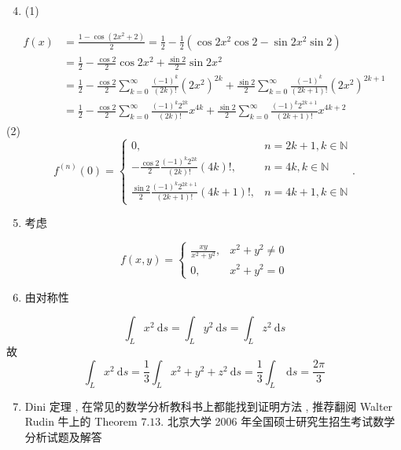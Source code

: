 \documentclass[10pt]{article}
\begin{document}
\begin{enumerate}
  \setcounter{enumi}{3}
  \item (1)
\end{enumerate}
$$
\begin{aligned}
f(x) &=\frac{1-\cos \left(2 x^{2}+2\right)}{2}=\frac{1}{2}-\frac{1}{2}\left(\cos 2 x^{2} \cos 2-\sin 2 x^{2} \sin 2\right) \\
&=\frac{1}{2}-\frac{\cos 2}{2} \cos 2 x^{2}+\frac{\sin 2}{2} \sin 2 x^{2} \\
&=\frac{1}{2}-\frac{\cos 2}{2} \sum_{k=0}^{\infty} \frac{(-1)^{k}}{(2 k) !}\left(2 x^{2}\right)^{2 k}+\frac{\sin 2}{2} \sum_{k=0}^{\infty} \frac{(-1)^{k}}{(2 k+1) !}\left(2 x^{2}\right)^{2 k+1} \\
&=\frac{1}{2}-\frac{\cos 2}{2} \sum_{k=0}^{\infty} \frac{(-1)^{k} 2^{2 k}}{(2 k) !} x^{4 k}+\frac{\sin 2}{2} \sum_{k=0}^{\infty} \frac{(-1)^{k} 2^{2 k+1}}{(2 k+1) !} x^{4 k+2}
\end{aligned}
$$
(2)
$$
f^{(n)}(0)=\left\{\begin{array}{ll}
0, & n=2 k+1, k \in \mathbb{N} \\
-\frac{\cos 2}{2} \frac{(-1)^{k} 2^{2 k}}{(2 k) !}(4 k) !, & n=4 k, k \in \mathbb{N} \\
\frac{\sin 2}{2} \frac{(-1)^{k} 2^{2 k+1}}{(2 k+1) !}(4 k+1) !, & n=4 k+1, k \in \mathbb{N}
\end{array} .\right.
$$

\begin{enumerate}
  \setcounter{enumi}{4}
  \item  考虑 
\end{enumerate}
$$
f(x, y)= \begin{cases}\frac{x y}{x^{2}+y^{2}}, & x^{2}+y^{2} \neq 0 \\ 0, & x^{2}+y^{2}=0\end{cases}
$$

\begin{enumerate}
  \setcounter{enumi}{5}
  \item  由对称性 
\end{enumerate}
$$
\int_{L} x^{2} \mathrm{~d} s=\int_{L} y^{2} \mathrm{~d} s=\int_{L} z^{2} \mathrm{~d} s
$$
 故 
$$
\int_{L} x^{2} \mathrm{~d} s=\frac{1}{3} \int_{L} x^{2}+y^{2}+z^{2} \mathrm{~d} s=\frac{1}{3} \int_{L} \mathrm{~d} s=\frac{2 \pi}{3}
$$

\begin{enumerate}
  \setcounter{enumi}{6}
  \item Dini  定理 ,  在常见的数学分析教科书上都能找到证明方法 ,  推荐翻阅  Walter Rudin  牛上的  Theorem $7.13$.  北京大学  2006  年全国硕士研究生招生考试数学分析试题及解答 
\end{enumerate}
   
\end{document}
